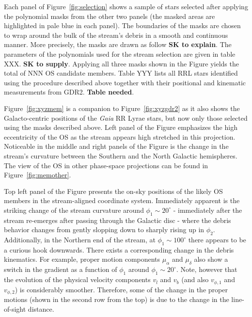 \documentclass[a4paper,useAMS,usenatbib]{mnras}
\newcommand{\gaia}{\textit{Gaia} }
\begin{document}
Each panel of Figure~\ref{fig:selection} shows a sample of stars
selected after applying the polynomial masks from the other two panels
(the masked areas are highlighted in pale blue in each panel). The
boundaries of the masks are chosen to wrap around the bulk of the
stream's debris in a smooth and continuous manner. More precisely, the
masks are drawn as follow {\bf SK to explain}. The parameters of the
polynomials used for the stream selection are given in table XXX. {\bf
  SK to supply}. Applying all three masks shown in the Figure yields
the total of NNN OS candidate members. Table YYY lists all RRL stars
identified using the procedure described above together with their
positional and kinematic measurements from GDR2. {\bf Table
  needed}.

Figure~\ref{fig:xyzmem} is a companion to Figure~\ref{fig:xyzgdr2} as
it also shows the Galacto-centric positions of the \gaia RR Lyrae
stars, but now only those selected using the masks described
above. Left panel of the Figure emphasizes the high eccentricity of
the OS as the stream appears high stretched in this
projection. Noticeable in the middle and right panels of the Figure is
the change in the stream's curvature between the Southern and the
North Galactic hemispheres. The view of the OS in other phase-space
projections can be found in Figure~\ref{fig:memother}.

Top left panel of the Figure presents the on-sky positions of the
likely OS members in the stream-aligned coordinate system. Immediately
apparent is the striking change of the stream curvature around
$\phi_1\sim20^{\circ}$ - immediately after the stream re-emerges after
passing through the Galactic disc - where the debris behavior changes
from gently slopping down to sharply rising up in
$\phi_2$. Additionally, in the Northern end of the stream, at
$\phi_1\sim100^{\circ}$ there appears to be a curious hook
downwards. There exists a corresponding change in the debris
kinematics. For example, proper motion components $\mu_{\alpha}$ and
$\mu_{\delta}$ also show a switch in the gradient as a function of
$\phi_1$ around $\phi_1\sim20^{\circ}$. Note, however that the
evolution of the physical velocity components $v_l$ and $v_b$ (and
also $v_{\phi,1}$ and $v_{\phi,2}$) is considerably
smoother. Therefore, some of the change in the proper motions (shown
in the second row from the top) is due to the change in the
line-of-sight distance.
\end{document}
